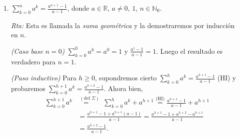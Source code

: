 \documentclass[a4paper,12pt,twoside,spanish,reqno]{amsbook}
\numberwithin{equation}{section}
\newcommand{\rta}{\noindent\textit{Rta: }}
\begin{document}
\begin{enumerate}
\begin{enumerate}
            \rta Inducción en $n$.
            
            \textit{(Caso base $n=1$) } $\sum_{i=1}^1 i^3 = 1 = (\frac{1 \cdot 2}{2})^2$. Verdadero. 
            
            \textit{(Paso inductivo) } Para  $k \ge 1$,  supondremos cierto $\sum_{i=1}^k i^3 = \left( \frac{k(k+1)}{2 }\right)^2$ (HI) y probaremos $\sum_{i=1}^{k+1} i^3 = \left( \frac{(k+1)(k+2)}{2 }\right)^2$. Ahora bien,
            \begin{align*}
                \sum_{i=1}^{k+1} i^3 &\overset{(\text{def } \Sigma)}{=} \sum_{i=1}^k i^3 + (k+1)^3 \overset{\text{(HI)}}{=}  \left( \frac{k(k+1)}{2 }\right)^2 + (k+1)^3 \\
                &= \frac{k^2(k+1)^2}{4 } + (k+1)^3 = (k+1)^2 \left(\frac{k^2}{4 } + k+1 \right)\\
                &= (k+1)^2 \left(\frac{k^2+4k +4}{4 } \right) = (k+1)^2\frac{(k+2)^2}{4 } \\
                &= \left( \frac{(k+1)(k+2)}{2 }\right)^2.
            \end{align*}
            
            \item\label{ej-serie-geometrica}  $\displaystyle{ \sum_{k=0}^n a^k = \frac{a^{n+1}-1}{a-1}}$, donde $a\in {\mathbb R}$, $a \neq 0,\ 1$, $n\in \mathbb N_0$.
            
            \rta Esta es llamada la \textit{suma geométrica} y la demostraremos por inducción en $n$.
            
            \textit{(Caso base $n=0$) } $\sum_{k=0}^0 a^k = a^0 = 1$ y $\frac{a^{1}-1}{a-1}=1$. Luego el resultado es verdadero para  $n=1$. 
            
            \textit{(Paso inductivo) }  Para  $h \ge 0$,  supondremos cierto $\sum_{k=0}^h a^k = \frac{a^{h+1}-1}{a-1}$ (HI) y probaremos $\sum_{k=0}^{h+1} a^k = \frac{a^{h+2}-1}{a-1}$. Ahora bien, 
            \begin{align*}
                \sum_{k=0}^{h+1} a^k &\overset{(\text{def } \Sigma)}{=\quad} \;\sum_{k=0}^h a^k + a^{h+1} \overset{\text{(HI)}}{=} \frac{a^{h+1}-1}{a-1} +  a^{h+1} \\
                &= \frac{a^{h+1}-1 + a^{h+1}(a-1)}{a-1} = \frac{a^{h+1}-1 + a^{h+2}-a^{h+1}}{a-1} \\
                &=\frac{a^{h+2}-1}{a-1}.
            \end{align*}
            
        
        \end{enumerate}
        

\end{enumerate}
\end{document}
